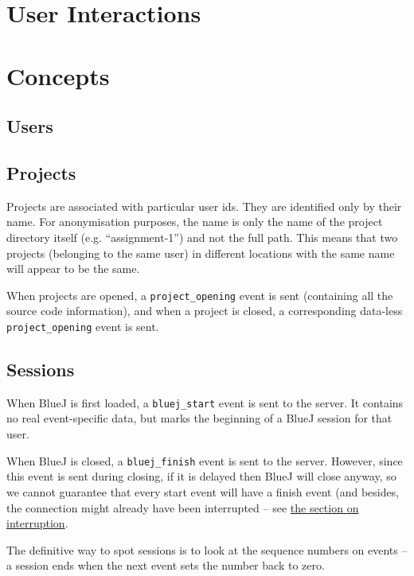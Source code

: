 \documentclass{book}
\begin{document}
\chapter{User Interactions}


\chapter{Concepts}

\section{Users}

\section{Projects}

Projects are associated with particular user ids.  They are identified only by
their name.  For anonymisation purposes, the name is only the name of the
project directory itself (e.g. ``assignment-1'') and not the full path.  This
means that two projects (belonging to the same user) in different locations with the same name will appear
to be the same.

When projects are opened, a \texttt{project\_opening} event is sent
(containing all the source code information), and when
a project is closed, a corresponding data-less \texttt{project\_opening} event
is sent.

\section{Sessions}
\label{def:sequence_id}

When BlueJ is first loaded, a \texttt{bluej\_start} event is sent to the
server.  It contains no real event-specific data, but marks the beginning of a
BlueJ session for that user.

When BlueJ is closed, a \texttt{bluej\_finish} event is sent to the server.
However, since this event is sent during closing, if it is delayed then BlueJ
will close anyway, so we cannot guarantee that every start event will have a
finish event (and besides, the connection might already have been interrupted
-- see \hyperref[def:interruption]{the section on interruption}.

The definitive way to spot sessions is to look at the sequence numbers on
events -- a session ends when the next event sets the number back to zero.
\end{document}
